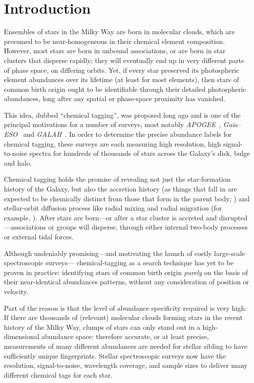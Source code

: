 \documentclass[12pt, letterpaper, preprint]{aastex}
\newcommand{\acronym}[1]{{\small{#1}}}
\newcommand{\project}[1]{\textsl{#1}}
\newcommand{\apogee}{\project{\acronym{APOGEE}}}
\newcommand{\gaiaeso}{\project{Gaia--\acronym{ESO}}}
\newcommand{\galah}{\project{\acronym{GALAH}}}
\begin{document}
\clearpage
\section{Introduction}\label{sec:intro}

Ensembles of stars in the Milky Way are born in molecular clouds,
which are presumed to be near-homogeneous in their chemical element
composition.
However, most stars are born in unbound associations, or are born in
star clusters that disperse rapidly; they will eventually end up in
very different parts of phase space, on differing orbits.
Yet, if every star preserved its photospheric element abundances over
its lifetime (at least for most elements), then stars of common birth
origin ought to be identifiable through their detailed photospheric
abundances, long after any spatial or phase-space proximity has
vanished.

This idea, dubbed ``chemical tagging'', was proposed long ago
\citep{freeman} and is one of the principal motivations for a number
of surveys, most notably \apogee\ \citep{apogee},
\gaiaeso\ \citep{gaiaeso} and \galah\ \citep{galah}.
In order to determine the precise abundance labels for chemical
tagging, these surveys are each measuring high resolution, high
signal-to-noise spectra for hundreds of thousands of stars across the
Galaxy's disk, bulge and halo.

Chemical tagging holds the promise of revealing not just the
star-formation history of the Galaxy, but also the accretion history
(as things that fall in are expected to be chemically distinct from
those that form in the parent body; \citealt{something}) and
stellar-orbit diffusion process like radial mixing and radial
migration (for example, \citealt{Roskar2009, quillen}).  After
stars are born---or after a star cluster is accreted and
disrupted---associations or groups will disperse, through either
internal two-body processes or external tidal forces.

Although undeniably promising---and motivating the 
launch of costly large-scale spectroscopic surveys---%
chemical-tagging as a search technique has yet to be proven in
practice: identifying stars of common birth origin {\it purely} on the
basis of their near-identical abundances patterns, without any
consideration of position or velocity.

Part of the reason is that the level of abundance specificity required
is very high:
If there are thousands of (relevant) molecular clouds forming stars in
the recent history of the Milky Way, clumps of stars can only stand
out in a high-dimensional abundance space: therefore accurate, or at
least precise, measurements of many different abundances are needed
for stellar sibling to have sufficiently unique fingerprints.
Stellar spectroscopic surveys now have the resolution, signal-to-noise,
wavelength coverage, and sample sizes to deliver many different chemical tags for each star.
\end{document}
